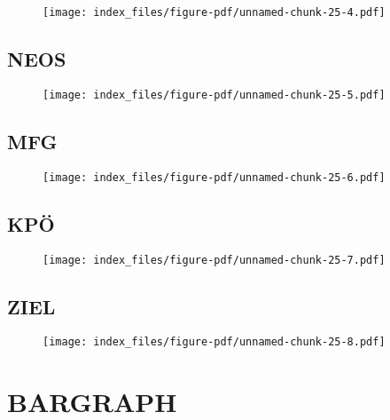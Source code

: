\documentclass[
  letterpaper,
  DIV=11,
  numbers=noendperiod,
  oneside]{scrartcl}
\begin{document}
\begin{figure*}
\begin{figure}[H]

\texttt{[image: index\_files/figure-pdf/unnamed-chunk-25-4.pdf]} \hfill{}

\end{figure}

\subsection{NEOS}

\begin{figure}[H]

\texttt{[image: index\_files/figure-pdf/unnamed-chunk-25-5.pdf]} \hfill{}

\end{figure}

\subsection{MFG}

\begin{figure}[H]

\texttt{[image: index\_files/figure-pdf/unnamed-chunk-25-6.pdf]} \hfill{}

\end{figure}

\subsection{KPÖ}

\begin{figure}[H]

\texttt{[image: index\_files/figure-pdf/unnamed-chunk-25-7.pdf]} \hfill{}

\end{figure}

\subsection{ZIEL}

\begin{figure}[H]

\texttt{[image: index\_files/figure-pdf/unnamed-chunk-25-8.pdf]} \hfill{}

\end{figure}

\end{figure*}

\hypertarget{bargraph}{%
\section{BARGRAPH}\label{bargraph}}
\end{document}
